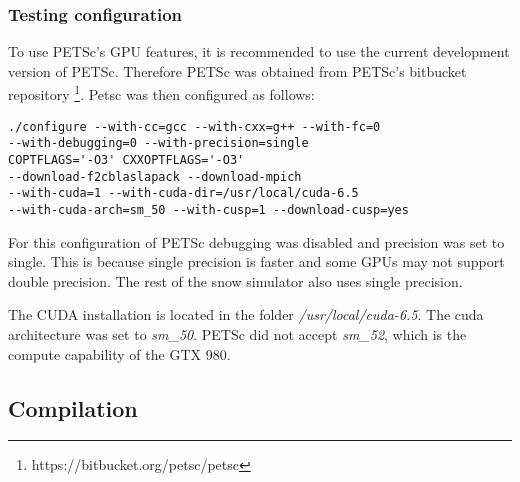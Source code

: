 \subsubsection{Testing configuration}

To use PETSc's GPU features, it is recommended to use the current development 
version of PETSc. Therefore PETSc was obtained from PETSc's bitbucket repository
\footnote{https://bitbucket.org/petsc/petsc}. Petsc was then configured as follows:
\lstset{language=bash}
\begin{lstlisting}
./configure --with-cc=gcc --with-cxx=g++ --with-fc=0
--with-debugging=0 --with-precision=single
COPTFLAGS='-O3' CXXOPTFLAGS='-O3' 
--download-f2cblaslapack --download-mpich
--with-cuda=1 --with-cuda-dir=/usr/local/cuda-6.5 
--with-cuda-arch=sm_50 --with-cusp=1 --download-cusp=yes
\end{lstlisting}
For this configuration of PETSc debugging was disabled and precision was set to 
single. This is because single precision is faster and some GPUs may not support 
double precision. The rest of the snow simulator also uses single precision.

The CUDA installation is located in the folder \emph{/usr/local/cuda-6.5}. The 
cuda architecture was set to \emph{sm\_50}. PETSc did not accept \emph{sm\_52}, 
which is the compute capability of the GTX 980. 

\subsection{Compilation}

